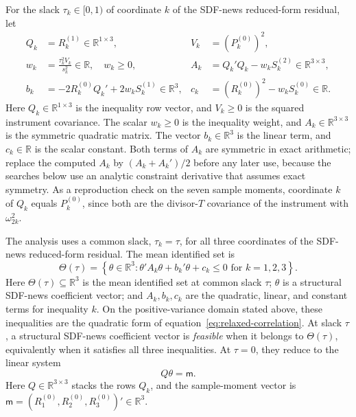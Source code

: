 \documentclass[11pt]{article}
\begin{document}
For the slack \(\tau_k\in[0,1)\) of coordinate \(k\) of the SDF-news reduced-form residual, let
\begin{align*}
 Q_k&=R_k^{(1)}\in\mathbb R^{1\times3},
 &V_k&=(P_k^{(0)})^2,\\
 w_k&=\frac{\tau_k^2V_k}{s_k^2}\in\mathbb R,\quad w_k\ge0,
 &A_k&=Q_k'Q_k-w_kS_k^{(2)}\in\mathbb R^{3\times3},\\
 b_k&=-2R_k^{(0)}Q_k'+2w_kS_k^{(1)}\in\mathbb R^3,
 &c_k&=(R_k^{(0)})^2-w_kS_k^{(0)}\in\mathbb R.
\end{align*}
Here \(Q_k\in\mathbb R^{1\times3}\) is the inequality row vector, and \(V_k\ge0\) is the squared
instrument covariance. The scalar \(w_k\ge0\) is the inequality weight, and
\(A_k\in\mathbb R^{3\times3}\) is the symmetric quadratic matrix. The vector
\(b_k\in\mathbb R^3\) is the linear term, and \(c_k\in\mathbb R\) is the scalar constant. Both terms
of \(A_k\) are symmetric in exact arithmetic; replace the computed \(A_k\) by
\((A_k+A_k')/2\) before any later use, because the searches below use an analytic constraint
derivative that assumes exact symmetry. As a reproduction check on the seven sample moments,
coordinate \(k\) of \(Q_k\) equals \(P_k^{(0)}\), since both are the divisor-\(T\) covariance of the
instrument with \(\omega_{2k}^2\).

The analysis uses a common slack, \(\tau_k=\tau\), for all three coordinates of the SDF-news
reduced-form residual. The mean identified set is
\begin{equation}
 \Theta(\tau)=\left\{\theta\in\mathbb R^3:
 \theta'A_k\theta+b_k'\theta+c_k\le0
 \text{ for }k=1,2,3\right\}.
 \label{eq:identified-set}
\end{equation}
Here \(\Theta(\tau)\subseteq\mathbb R^3\) is the mean identified set at common slack \(\tau\);
\(\theta\) is a structural SDF-news coefficient vector; and \(A_k,b_k,c_k\) are the quadratic,
linear, and constant terms for inequality \(k\). On the positive-variance domain stated above, these
inequalities are the quadratic form of equation~\eqref{eq:relaxed-correlation}. At
slack \(\tau\), a structural SDF-news coefficient vector is \emph{feasible} when it belongs to
\(\Theta(\tau)\), equivalently when it satisfies all three inequalities. At
\(\tau=0\), they reduce to the linear system
\begin{equation}
 Q\theta=\mathsf m.
 \label{eq:tau-zero-system}
\end{equation}
Here \(Q\in\mathbb R^{3\times3}\) stacks the rows \(Q_k\), and the sample-moment vector is
\(\mathsf m=(R_1^{(0)},R_2^{(0)},R_3^{(0)})'\in\mathbb R^3\).
\end{document}
